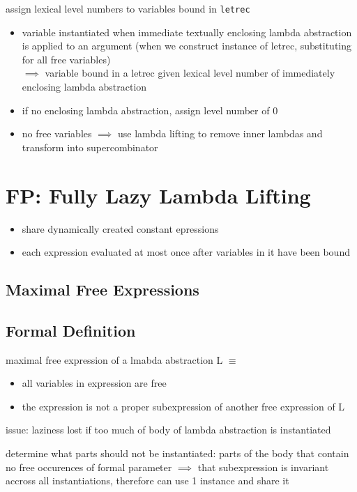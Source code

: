 \documentclass[8pt]{extarticle}
\begin{document}
\begin{multicols*}{2}
assign lexical level numbers to variables bound in \verb|letrec|
\begin{itemize}
\item variable instantiated when immediate textually enclosing lambda abstraction is applied to an argument (when we construct instance of letrec, substituting for all free variables)\\
  $\implies$ variable bound in a letrec given lexical level number of immediately enclosing lambda abstraction

\item if no enclosing lambda abstraction, assign level number of 0
\item no free variables $\implies$ use lambda lifting to remove inner lambdas and transform into supercombinator
\end{itemize}

\vfill\null
\columnbreak

\section{FP: Fully Lazy Lambda Lifting}

\begin{itemize}
\item share dynamically created constant epressions
\item each expression evaluated at most once after variables in it have been bound
\end{itemize}

\subsection{Maximal Free Expressions}

\subsection{Formal Definition}
maximal free expression of a lmabda abstraction L $\equiv$
\begin{itemize}
\item all variables in expression are free
\item the expression is not a proper subexpression of another free expression of L
\end{itemize}

issue: laziness lost if too much of body of lambda abstraction is instantiated

determine what parts should not be instantiated: parts of the body that contain no free occurences of formal parameter $\implies$ that subexpression is invariant accross all instantiations, therefore can use 1 instance and share it


\end{multicols*}
\end{document}

